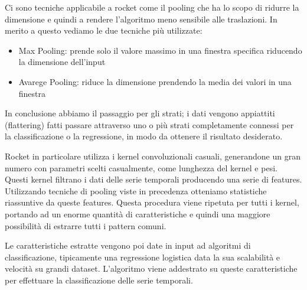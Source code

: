 Ci sono tecniche applicabile a rocket come il pooling che ha lo scopo di ridurre la dimensione e quindi a rendere l'algoritmo meno sensibile alle traslazioni. In merito a questo vediamo le due tecniche più utilizzate:
\begin{itemize}
    \item Max Pooling: prende solo il valore massimo in una finestra specifica riducendo la dimensione dell'input
    \item Avarege Pooling: riduce la dimensione prendendo la media dei valori in una finestra
\end{itemize}

In conclusione abbiamo il passaggio per gli strati; i dati vengono appiattiti (flattering) fatti passare attraverso uno o più strati completamente connessi per la classificazione o la regressione, in modo da ottenere il risultato desiderato.

Rocket in particolare utilizza i kernel convoluzionali casuali, generandone un gran numero con parametri scelti casualmente, come lunghezza del kernel e pesi.
Questi kernel filtrano i dati delle serie temporali producendo una serie di features. Utilizzando tecniche di pooling viste in precedenza otteniamo statistiche riassuntive da queste features.
Questa procedura viene ripetuta per tutti i kernel, portando ad un enorme quantità di caratteristiche e quindi una maggiore possibilità di estrarre tutti i pattern comuni.

Le caratteristiche estratte vengono poi date in input ad algoritmi di classificazione, tipicamente una regressione logistica data la sua scalabilità e velocità su grandi dataset.
L'algoritmo viene addestrato su queste caratteristiche per effettuare la classificazione delle serie temporali.

